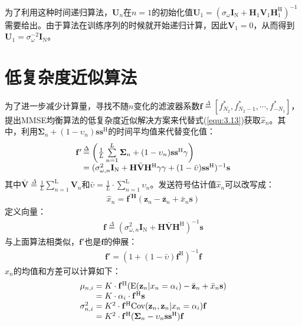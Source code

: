 为了利用这种时间递归算法，$\mathbf{U}_n$在$n=1$的初始化值$\mathbf{U}_1=(\sigma_{\omega}\mathbf{I}_{\mathrm{N}}+\mathbf{H}_1\mathbf{V}_1\mathbf{H}_1^{\mathrm{H}})^{-1}$需要给出。由于算法在训练序列的时候就开始递归计算，因此$\mathbf{V}_1=0$，从而得到$\mathbf{U}_1=\sigma_{\omega}^{-2}\mathbf{I}_{\mathrm{N}}$。
\section{低复杂度近似算法}
为了进一步减少计算量，寻找不随$n$变化的滤波器系数$\mathbf{f}\overset{\Delta}{=}[f_{N_2}^*,f_{N_2-1}^*,\cdots,f_{-N_1}^*]$，提出MMSE均衡算法的低复杂度近似解决方案来代替式(\ref{equ:3.13})获取$\hat{x}_n$。其中，利用$\boldsymbol{\Sigma}_n+(1-\upsilon_n)\mathbf{s}\mathbf{s}^{\mathrm{H}}$的时间平均值来代替变化值：
\begin{eqnarray}
    \begin{array}{l@{\,}l}
        {\mathbf{f}}'&\overset{\Delta}{=}\left(\frac{1}{L}\sum\limits_{n=1}^{L}\boldsymbol{\Sigma}_n+(1-\upsilon_n)\mathbf{s}\mathbf{s}^{\mathrm{H}}\gamma\right)\\
        &=(\sigma_{\omega,n}^2\mathbf{I}_{\mathrm{N}}+\mathbf{H}\bar{\mathbf{V}}\mathbf{H}^{\mathrm{H}}\gamma\gamma+(1-\bar{\upsilon})\mathbf{s}\mathbf{s}^{\mathrm{H}})^{-1}\mathbf{s}
    \end{array}
    \label{equ:3.30}
\end{eqnarray}
其中$\bar{\mathbf{V}}\overset{\Delta}{=}\frac{1}{L}\sum_{n=1}^\mathrm{L}\mathbf{V}_n$和$\bar{\upsilon}=\frac{1}{L}\cdot
\sum_{n=1}^\mathrm{L}\upsilon_n$。发送符号估计值$\hat{x}_n$可以改写成：
\begin{eqnarray}
    \hat{x}_n=\mathbf{f}^{'\mathbf{H}}(\mathbf{z}_n-\bar{\mathbf{z}}_n+\bar{x}_n\mathbf{s})
    \label{equ:3.31}
\end{eqnarray}
定义向量：
\begin{eqnarray}
    \mathbf{f}\overset{\Delta}{=}(\sigma_{\omega,n}^2\mathbf{I}_{\mathrm{N}}+\mathbf{H}\bar{\mathbf{V}}\mathbf{H}^{\mathrm{H}})^{-1}\mathbf{s}
    \label{equ:3.32}
\end{eqnarray}
与上面算法相类似，${\mathbf{f}}'$也是$\mathbf{f}$的伸展：
\begin{eqnarray}
    {\mathbf{f}}'=(1+(1-\bar{\upsilon})\mathbf{f}^{\mathrm{H}})^{-1}\mathbf{f}
    \label{equ:3.33}
\end{eqnarray}
$\hat{x}_n$的均值和方差可以计算如下：
\begin{eqnarray}
    \begin{array}{l@{\;=\;}l}
        \mu_{n,i}&K\cdot\mathbf{f}^{\mathrm{H}}(\mathrm{E}(\mathbf{z}_n|x_n=\alpha_i)-\bar{\mathbf{z}}_n+\bar{x}_n\mathbf{s})\\
        &K\cdot\alpha_i\cdot\mathbf{f}^{\mathrm{H}}\mathbf{s}\\
        \sigma_{n,i}^2&K^2\cdot\mathbf{f}^{\mathrm{H}}\mathrm{Cov}(\mathbf{z}_n,\mathbf{z}_n|x_n=\alpha_i)\mathbf{f}\\
        &K^2\cdot\mathbf{f}^{\mathrm{H}}(\boldsymbol{\Sigma}_n-\upsilon_n\mathbf{s}\mathbf{s}^{\mathrm{H}})\mathbf{f}
    \end{array}
    \label{equ:3.34}
\end{eqnarray}
